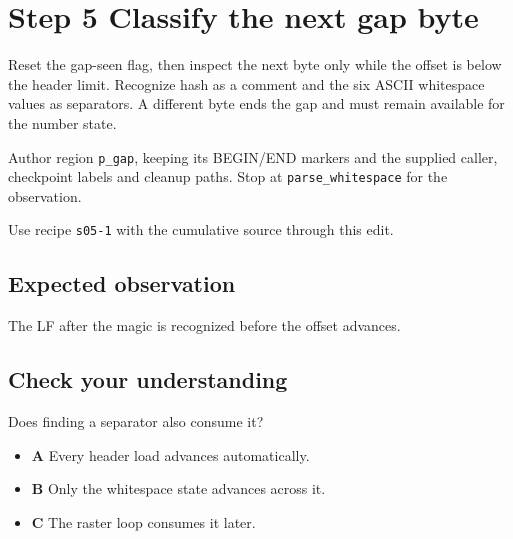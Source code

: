 \section{Step 5 Classify the next gap byte}\label{ppm-s05}

Reset the gap-seen flag, then inspect the next byte only while the offset is below the header limit. Recognize hash as a comment and the six ASCII whitespace values as separators. A different byte ends the gap and must remain available for the number state.

Author region \texttt{p\_gap}, keeping its BEGIN/END markers and the supplied caller, checkpoint labels and cleanup paths. Stop at \texttt{parse\_whitespace} for the observation.

Use recipe \texttt{s05-1} with the cumulative source through this edit.

\subsection{Expected observation}
The LF after the magic is recognized before the offset advances.

\subsection{Check your understanding}
Does finding a separator also consume it?

\begin{itemize}
  \item \textbf{A} Every header load advances automatically.
  \item \textbf{B} Only the whitespace state advances across it.
  \item \textbf{C} The raster loop consumes it later.
\end{itemize}

